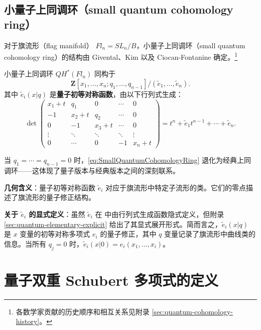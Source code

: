 \subsection{小量子上同调环（small quantum cohomology ring）}

对于旗流形（flag manifold） $Fl_n = SL_n / B$，小量子上同调环（small quantum cohomology ring）的结构由 Givental、Kim 以及 Ciocan-Fontanine 确定。\footnote{各数学家贡献的历史顺序和相互关系见附录 \cref{sec:quantum-cohomology-history}。}

\begin{Theorem}
\label{th:SmallQuantumCohomology}
小量子上同调环 $QH^*(Fl_n)$ 同构于
\[
\mathbf{Z}[x_1, \ldots, x_n; q_1, \ldots, q_{n-1}] / (\widetilde{e}_1, \ldots, \widetilde{e}_n).
\label{eq:SmallQuantumCohomologyRing}
\]
其中 $\widetilde{e}_i(x|q)$ 是\textbf{量子初等对称函数}，由以下行列式生成：
\[
\det\begin{pmatrix}
x_1 + t & q_1 & 0 & \cdots & 0 \\
-1 & x_2 + t & q_2 & \cdots & 0 \\
0 & -1 & x_3 + t & \cdots & 0 \\
\vdots & \ddots & \ddots & \ddots & \vdots \\
0 & \cdots & 0 & -1 & x_n + t
\end{pmatrix}
= t^n + \widetilde{e}_1 t^{n-1} + \cdots + \widetilde{e}_n.
\label{eq:QuantumElementaryGeneratingFunction}
\]
\end{Theorem}

当 $q_1 = \cdots = q_{n-1} = 0$ 时，\eqref{eq:SmallQuantumCohomologyRing} 退化为经典上同调环——这体现了量子版本与经典版本之间的深刻联系。

\textbf{几何含义}：量子初等对称函数 $\widetilde{e}_i$ 对应于旗流形中特定子流形的类。它们的零点描述了旗流形的量子修正结构。

\textbf{关于 $\widetilde{e}_i$ 的显式定义}：虽然 $\widetilde{e}_i$ 在 \cite{KM} 中由行列式生成函数隐式定义，但附录 \cref{sec:quantum-elementary-explicit} 给出了其显式展开形式。简而言之，$\widetilde{e}_i(x|q)$ 是 $x$ 变量的初等对称多项式 $e_i$ 的量子修正，其中 $q$ 变量记录了旗流形中曲线类的信息。当所有 $q_j = 0$ 时，$\widetilde{e}_i(x|0) = e_i(x_1, \ldots, x_i)$。

\section{量子双重 Schubert 多项式的定义}
\label{sec:DefinitionQuantumDouble}

